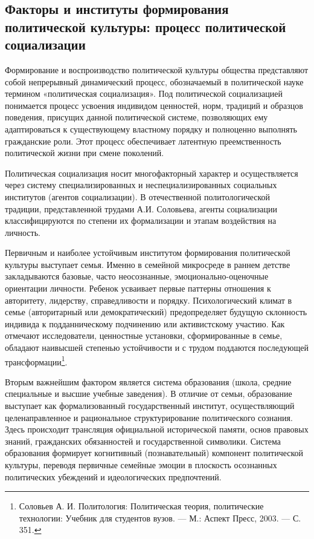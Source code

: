 \subsection{Факторы и институты формирования политической культуры: процесс политической социализации}

Формирование и воспроизводство политической культуры общества представляют собой непрерывный динамический процесс, обозначаемый в политической науке термином «политическая социализация». Под политической социализацией понимается процесс усвоения индивидом ценностей, норм, традиций и образцов поведения, присущих данной политической системе, позволяющих ему адаптироваться к существующему властному порядку и полноценно выполнять гражданские роли. Этот процесс обеспечивает латентную преемственность политической жизни при смене поколений.

Политическая социализация носит многофакторный характер и осуществляется через систему специализированных и неспециализированных социальных институтов (агентов социализации). В отечественной политологической традиции, представленной трудами А.И. Соловьева, агенты социализации классифицируются по степени их формализации и этапам воздействия на личность.

Первичным и наиболее устойчивым институтом формирования политической культуры выступает семья. Именно в семейной микросреде в раннем детстве закладываются базовые, часто неосознанные, эмоционально-оценочные ориентации личности. Ребенок усваивает первые паттерны отношения к авторитету, лидерству, справедливости и порядку. Психологический климат в семье (авторитарный или демократический) предопределяет будущую склонность индивида к подданническому подчинению или активистскому участию. Как отмечают исследователи, ценностные установки, сформированные в семье, обладают наивысшей степенью устойчивости и с трудом поддаются последующей трансформации\footnote{Соловьев А. И. Политология: Политическая теория, политические технологии: Учебник для студентов вузов. --- М.: Аспект Пресс, 2003. --- С. 351.}.

Вторым важнейшим фактором является система образования (школа, средние специальные и высшие учебные заведения). В отличие от семьи, образование выступает как формализованный государственный институт, осуществляющий целенаправленное и рациональное структурирование политического сознания. Здесь происходит трансляция официальной исторической памяти, основ правовых знаний, гражданских обязанностей и государственной символики. Система образования формирует когнитивный (познавательный) компонент политической культуры, переводя первичные семейные эмоции в плоскость осознанных политических убеждений и идеологических предпочтений.


